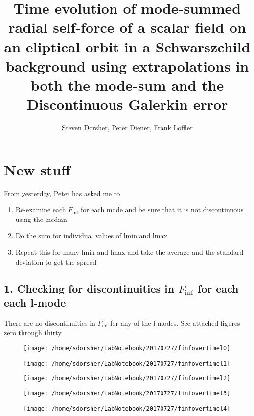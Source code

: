 \documentclass{article}
\begin{document}
\title{Time evolution of mode-summed radial self-force of a scalar field on an eliptical orbit in a Schwarszchild background using extrapolations in both the mode-sum and the Discontinuous Galerkin error}
\author{Steven Dorsher, Peter Diener, Frank L\"{o}ffler}
\maketitle


\section{New stuff}

From yesterday, Peter has asked me to
\begin{enumerate}
\item Re-examine each $F_{\inf}$ for each mode and be sure that it is not discontinuous using the median
\item Do the sum for individual values of lmin and lmax
\item Repeat this for many lmin and lmax and take the average and the standard deviation to get the spread
\end{enumerate}

\subsection{1. Checking for discontinuities in $F_{\inf}$ for each each l-mode}

There are no discontinuities in $F_{\inf}$ for any of the l-modes. See attached figures zero through thirty.

\begin{figure}
  \texttt{[image: /home/sdorsher/LabNotebook/20170727/finfovertimel0]}
\end{figure}

\begin{figure}
  \texttt{[image: /home/sdorsher/LabNotebook/20170727/finfovertimel1]}
\end{figure}

\begin{figure}
  \texttt{[image: /home/sdorsher/LabNotebook/20170727/finfovertimel2]}
\end{figure}

\begin{figure}
  \texttt{[image: /home/sdorsher/LabNotebook/20170727/finfovertimel3]}
\end{figure}

\begin{figure}
  \texttt{[image: /home/sdorsher/LabNotebook/20170727/finfovertimel4]}
\end{figure}
\end{document}

